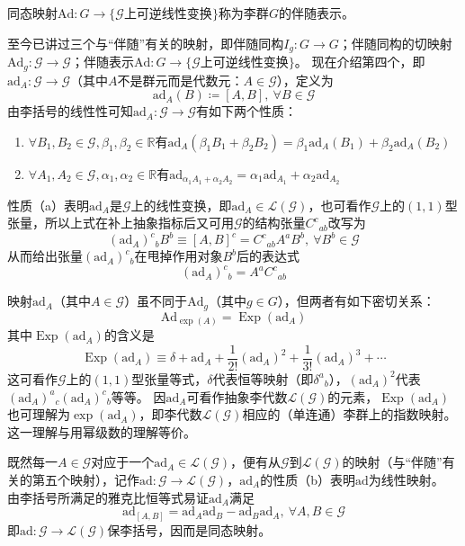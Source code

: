\begin{definition}
    同态映射$\mathrm{Ad} \colon G \to \{\mathscr{G}\text{上可逆线性变换}\}$称为李群$G$的伴随表示。
\end{definition}

至今已讲过三个与``伴随''有关的映射，即伴随同构$I_g \colon G \to G$；伴随同构的切映射$\mathrm{Ad}_g \colon \mathscr{G} \to \mathscr{G}$；伴随表示$\mathrm{Ad} \colon G \to \{\mathscr{G}\text{上可逆线性变换}\}$。
现在介绍第四个，即$\mathrm{ad}_A \colon \mathscr{G} \to \mathscr{G}$（其中$A$不是群元而是代数元：$A \in \mathscr{G}$），定义为
$$\mathrm{ad}_A(B) \coloneq [A, B], ~ \forall B \in \mathscr{G}$$
由李括号的线性性可知$\mathrm{ad}_A \colon \mathscr{G} \to \mathscr{G}$有如下两个性质：
\begin{enumerate}[（a）]
    \item $\forall B_1, B_2 \in \mathscr{G}, \beta_1, \beta_2 \in \mathbb{R}$有$\mathrm{ad}_A(\beta_1B_1 + \beta_2B_2) = \beta_1\mathrm{ad}_A(B_1) + \beta_2\mathrm{ad}_A(B_2)$
    \item $\forall A_1, A_2 \in \mathscr{G}, \alpha_1, \alpha_2 \in \mathbb{R}$有$\mathrm{ad}_{\alpha_1A_1 + \alpha_2A_2} = \alpha_1\mathrm{ad}_{A_1} + \alpha_2\mathrm{ad}_{A_2}$
\end{enumerate}
性质（a）表明$\mathrm{ad}_A$是$\mathscr{G}$上的线性变换，即$\mathrm{ad}_A \in \mathscr{L}(\mathscr{G})$，也可看作$\mathscr{G}$上的$(1, 1)$型张量，所以上式在补上抽象指标后又可用$\mathscr{G}$的结构张量$C^c{}_{ab}$改写为
$$(\mathrm{ad}_A)^c{}_{b}B^b \equiv [A, B]^c = C^c{}_{ab}A^aB^b, ~ \forall B^b \in \mathscr{G}$$
从而给出张量$(\mathrm{ad}_A)^c{}_{b}$在甩掉作用对象$B^b$后的表达式
$$(\mathrm{ad}_A)^c{}_{b} = A^aC^c{}_{ab}$$

映射$\mathrm{ad}_A$（其中$A \in \mathscr{G}$）虽不同于$\mathrm{Ad}_g$（其中$g \in G$），但两者有如下密切关系：
$$\mathrm{Ad}_{\exp(A)} = \operatorname{Exp}(\mathrm{ad}_A)$$
其中$\operatorname{Exp}(\mathrm{ad}_A)$的含义是
$$\operatorname{Exp}(\mathrm{ad}_A) \equiv \delta + \mathrm{ad}_A + \frac{1}{2!}(\mathrm{ad}_A)^2 + \frac{1}{3!}(\mathrm{ad}_A)^3 + \cdots$$
这可看作$\mathscr{G}$上的$(1, 1)$型张量等式，$\delta$代表恒等映射（即$\delta^a{}_b$），$(\mathrm{ad}_A)^2$代表$(\mathrm{ad}_A)^a{}_c(\mathrm{ad}_A)^c{}_b$等等。
因$\mathrm{ad}_A$可看作抽象李代数$\mathscr{L}(\mathscr{G})$的元素，$\operatorname{Exp}(\mathrm{ad}_A)$也可理解为$\exp(\mathrm{ad}_A)$，即李代数$\mathscr{L}(\mathscr{G})$相应的（单连通）李群上的指数映射。
这一理解与用幂级数的理解等价。

既然每一$A \in \mathscr{G}$对应于一个$\mathrm{ad}_A \in \mathscr{L}(\mathscr{G})$，便有从$\mathscr{G}$到$\mathscr{L}(\mathscr{G})$的映射（与``伴随''有关的第五个映射），记作$\mathrm{ad} \colon \mathscr{G} \to \mathscr{L}(\mathscr{G})$，$\mathrm{ad}_A$的性质（b）表明$\mathrm{ad}$为线性映射。
由李括号所满足的雅克比恒等式易证$\mathrm{ad}_A$满足
$$\mathrm{ad}_{[A, B]} = \mathrm{ad}_A\mathrm{ad}_B - \mathrm{ad}_B\mathrm{ad}_A, ~ \forall A, B \in \mathscr{G}$$
即$\mathrm{ad} \colon \mathscr{G} \to \mathscr{L}(\mathscr{G})$保李括号，因而是同态映射。

